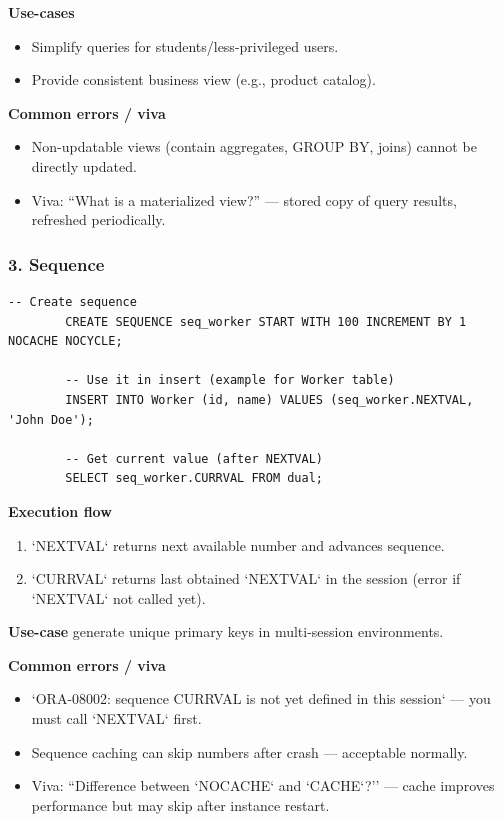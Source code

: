 \documentclass[11pt,a4paper]{article}
\begin{document}
	\textbf{Use-cases}
	\begin{itemize}[noitemsep]
		\item Simplify queries for students/less-privileged users.  
		\item Provide consistent business view (e.g., product catalog).  
	\end{itemize}
	
	\textbf{Common errors / viva}
	\begin{itemize}[noitemsep]
		\item Non-updatable views (contain aggregates, GROUP BY, joins) cannot be directly updated.  
		\item Viva: ``What is a materialized view?'' — stored copy of query results, refreshed periodically.
	\end{itemize}
	
	\bigskip
	\subsubsection*{3. Sequence}
	\begin{lstlisting}[caption={Create and use a sequence}]
		-- Create sequence
		CREATE SEQUENCE seq_worker START WITH 100 INCREMENT BY 1 NOCACHE NOCYCLE;
		
		-- Use it in insert (example for Worker table)
		INSERT INTO Worker (id, name) VALUES (seq_worker.NEXTVAL, 'John Doe');
		
		-- Get current value (after NEXTVAL)
		SELECT seq_worker.CURRVAL FROM dual;
	\end{lstlisting}
	
	\textbf{Execution flow}
	\begin{enumerate}[noitemsep]
		\item `NEXTVAL` returns next available number and advances sequence.  
		\item `CURRVAL` returns last obtained `NEXTVAL` in the session (error if `NEXTVAL` not called yet).  
	\end{enumerate}
	
	\textbf{Use-case} generate unique primary keys in multi-session environments.
	
	\textbf{Common errors / viva}
	\begin{itemize}[noitemsep]
		\item `ORA-08002: sequence CURRVAL is not yet defined in this session` — you must call `NEXTVAL` first.  
		\item Sequence caching can skip numbers after crash — acceptable normally.  
		\item Viva: ``Difference between `NOCACHE` and `CACHE`?'' — cache improves performance but may skip after instance restart.
	\end{itemize}
	
\end{document}
